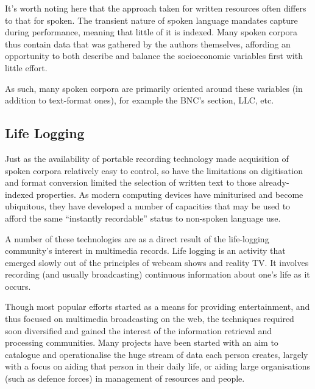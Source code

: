 
It's worth noting here that the approach taken for written resources often differs to that for spoken.  The transient nature of spoken language mandates capture during performance, meaning that little of it is indexed.  Many spoken corpora thus contain data that was gathered by the authors themselves, affording an opportunity to both describe and balance the socioeconomic variables first with little effort.

As such, many spoken corpora are primarily oriented around these variables (in addition to text-format ones), for example the BNC's section, LLC, etc.  


\subsection{Life Logging}
Just as the availability of portable recording technology made acquisition of spoken corpora relatively easy to control, so have the limitations on digitisation and format conversion limited the selection of written text to those already-indexed properties.  As modern computing devices have miniturised and become ubiquitous, they have developed a number of capacities that may be used to afford the same ``instantly recordable'' status to non-spoken language use.


A number of these technologies are as a direct result of the life-logging community's interest in multimedia records.  Life logging is an activity that emerged slowly out of the principles of webcam shows and reality TV.  It involves recording (and usually broadcasting) continuous information about one's life as it occurs.

Though most popular efforts started as a means for providing entertainment, and thus focused on multimedia broadcasting on the web, the techniques required soon diversified and gained the interest of the information retrieval and processing communities.  Many projects have been started with an aim to catalogue and operationalise the huge stream of data each person creates, largely with a focus on aiding that person in their daily life, or aiding large organisations (such as defence forces) in management of resources and people.



